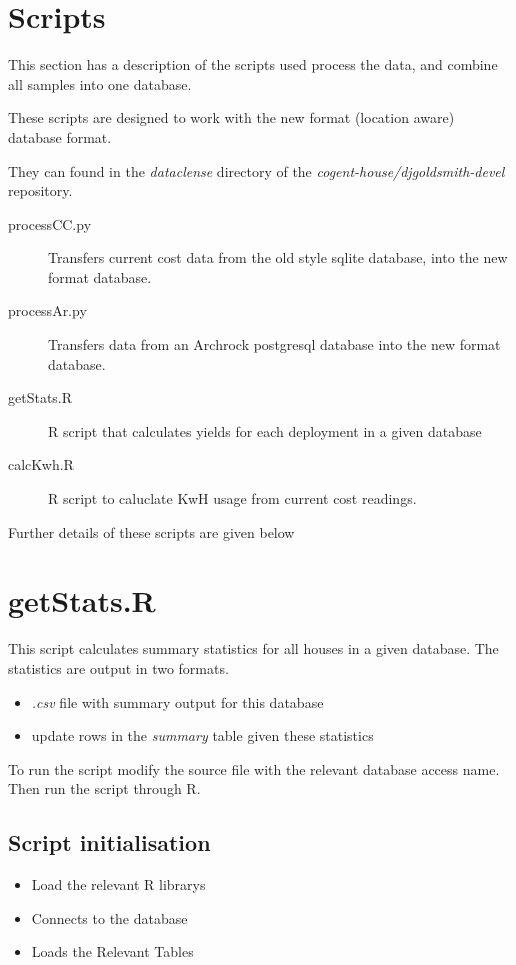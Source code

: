 \documentclass[10pt,a4paper]{article}
\begin{document}
\section{Scripts}
This section has a description of the scripts used process the data, and combine
all samples into one database.

These scripts are designed to work with the new format (location aware) database format.

They can found in the \emph{dataclense} directory of the \emph{cogent-house/djgoldsmith-devel} repository.

\begin{description}
    \item[processCC.py]  Transfers current cost data from the old style sqlite
      database, into the new format database.
    \item[processAr.py] Transfers data from an Archrock postgresql database into the
      new format database.
    \item[getStats.R] R script that calculates yields for each deployment in a given database
    \item[calcKwh.R] R script to caluclate KwH usage from current cost readings.
\end{description}

Further details of these scripts are given below

\section{getStats.R}

This script calculates summary statistics for all houses in a given database.
The statistics are output in two formats.
\begin{itemize}
  \item \emph{.csv} file with summary output for this database
  \item update rows in the \emph{summary} table given these statistics
\end{itemize}

To run the script modify the source file with the relevant database access
name. Then run the script through R. 


\subsection{Script initialisation}

\begin{itemize}
\item Load the relevant R librarys
\item Connects to the database
\item Loads the Relevant Tables

\end{itemize}
\end{document}
